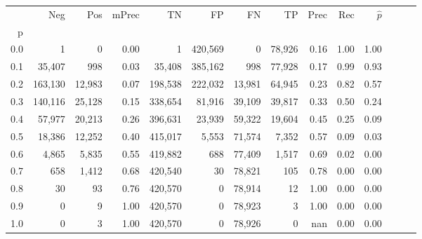 \begin{tabular}{rrrrrrrrrrrrrr}
\toprule
{} &      Neg &     Pos & mPrec &       TN &       FP &      FN &      TP &  Prec &   Rec & $\hat{p}$ \\
p   &          &         &       &          &          &         &         &       &       &           \\
\midrule
0.0 &        1 &       0 &  0.00 &        1 &  420,569 &       0 &  78,926 &  0.16 &  1.00 &      1.00 \\
0.1 &   35,407 &     998 &  0.03 &   35,408 &  385,162 &     998 &  77,928 &  0.17 &  0.99 &      0.93 \\
0.2 &  163,130 &  12,983 &  0.07 &  198,538 &  222,032 &  13,981 &  64,945 &  0.23 &  0.82 &      0.57 \\
0.3 &  140,116 &  25,128 &  0.15 &  338,654 &   81,916 &  39,109 &  39,817 &  0.33 &  0.50 &      0.24 \\
0.4 &   57,977 &  20,213 &  0.26 &  396,631 &   23,939 &  59,322 &  19,604 &  0.45 &  0.25 &      0.09 \\
0.5 &   18,386 &  12,252 &  0.40 &  415,017 &    5,553 &  71,574 &   7,352 &  0.57 &  0.09 &      0.03 \\
0.6 &    4,865 &   5,835 &  0.55 &  419,882 &      688 &  77,409 &   1,517 &  0.69 &  0.02 &      0.00 \\
0.7 &      658 &   1,412 &  0.68 &  420,540 &       30 &  78,821 &     105 &  0.78 &  0.00 &      0.00 \\
0.8 &       30 &      93 &  0.76 &  420,570 &        0 &  78,914 &      12 &  1.00 &  0.00 &      0.00 \\
0.9 &        0 &       9 &  1.00 &  420,570 &        0 &  78,923 &       3 &  1.00 &  0.00 &      0.00 \\
1.0 &        0 &       3 &  1.00 &  420,570 &        0 &  78,926 &       0 &   nan &  0.00 &      0.00 \\
\bottomrule
\end{tabular}
